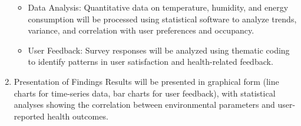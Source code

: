 \documentclass{article}
\begin{document}
\begin{enumerate}
\begin{itemize}
    \item Data Analysis: Quantitative data on temperature, humidity, and energy consumption will be processed using statistical software to analyze trends, variance, and correlation with user preferences and occupancy.
    \item User Feedback: Survey responses will be analyzed using thematic coding to identify patterns in user satisfaction and health-related feedback.
\end{itemize}
    \item Presentation of Findings
Results will be presented in graphical form (line charts for time-series data, bar charts for user feedback), with statistical analyses showing the correlation between environmental parameters and user-reported health outcomes.
\end{enumerate}
\end{document}
